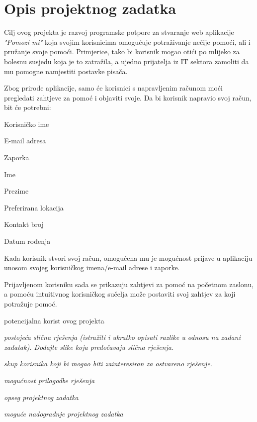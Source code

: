 \chapter{Opis projektnog zadatka}


Cilj ovog projekta je razvoj programske potpore za stvaranje web aplikacije \textit{"Pomozi mi"} koja svojim korisnicima omogućuje potraživanje nečije pomoći, ali i pružanje svoje pomoći. 
Primjerice, tako bi korisnik mogao otići po mlijeko za bolesnu susjedu koja je to zatražila, a ujedno prijatelja iz IT sektora zamoliti da mu pomogne namjestiti postavke pisača. 

Zbog prirode aplikacije, samo će korisnici s napravljenim računom moći pregledati zahtjeve za pomoć i objaviti svoje. Da bi korisnik napravio svoj račun, bit će potrebni:
\begin{packed_item}
	\item Korisničko ime
	\item E-mail adresa
	\item Zaporka
	\item Ime
	\item Prezime
	\item Preferirana lokacija
	\item Kontakt broj
	\item Datum rođenja
\end{packed_item}

Kada korisnik stvori svoj račun, omogućena mu je mogućnost prijave u aplikaciju unosom svojeg korisničkog imena/e-mail adrese i zaporke.

Prijavljenom korisniku sada se prikazuju zahtjevi za pomoć na početnom zaslonu, a pomoću intuitivnog korisničkog sučelja može postaviti svoj zahtjev za koji potražuje pomoć. 
\begin{packed_item}
	\item \textsf{potencijalna korist ovog projekta}
	\item \textit{postojeća slična rješenja (istražiti i ukratko opisati razlike u odnosu na zadani zadatak). Dodajte slike koja predočavaju slična rješenja.}
	\item \textit{skup korisnika koji bi mogao biti zainteresiran za ostvareno rješenje.}
	\item \textit{mogućnost prilagodbe rješenja }
	\item \textit{opseg projektnog zadatka}
	\item \textit{moguće nadogradnje projektnog zadatka}
\end{packed_item}

